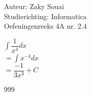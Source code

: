 \documentclass[a4paper]{article}
\begin{document}
  
\noindent \large Auteur: Zaky Souai \\
\noindent \large Studierichting:  Informatica\\
\noindent \large Oefeningenreeks 4A nr. 2.4\\

\bigskip

\normalsize

$\displaystyle\int \dfrac{1}{x^4}dx$ \\

$= \displaystyle\int x^{-4}dx$ \\

$= \dfrac{-1}{3x^3} + C$ \\



\begin{thebibliography}{999}
\end{thebibliography}
\end{document}
